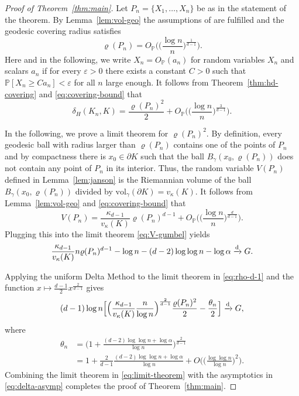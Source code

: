 \documentclass[a4paper,12pt,reqno]{amsart}
\theoremstyle{definition}
\newcommand{\IP}{\mathbb{P}}
\newcommand{\vol}{\mathrm{vol}}
\begin{document}
\begin{proof}[Proof of Theorem~\ref{thm:main}]
	Let $P_n=\{X_1,\dots,X_n\}$ be as in the statement of the theorem. By Lemma~\ref{lem:vol-geo} the assumptions of \cite[Theorem~2.1]{RS16} are fulfilled and the geodesic covering radius satisfies
\begin{equation} \label{eq:covering-bound}
	\varrho(P_n)=O_{\IP}\Big(\Big(\frac{\log n}{n}\Big)^{\frac{1}{d-1}}\Big).
\end{equation}
Here and in the following, we write $X_n=O_{\IP}(a_n)$ for random variables $X_n$ and scalars $a_n$ if for every $\varepsilon>0$ there exists a constant $C>0$ such that $\IP[X_n\ge Ca_n]<\varepsilon$ for all $n$ large enough. It follows from Theorem~\ref{thm:hd-covering} and \eqref{eq:covering-bound} that
\begin{equation} \label{eq:delta-asymp}
\delta_H(K_n,K)
=\frac{\varrho(P_n)^2}{2}+O_{\IP}\Big(\Big(\frac{\log n}{n}\Big)^{\frac{3}{d-1}}\Big).
\end{equation}

In the following, we prove a limit theorem for $\varrho(P_n)^2$. By definition, every geodesic ball with radius larger than $\varrho(P_n)$ contains one of the points of $P_n$ and by compactness there is $x_0\in \partial K$ such that the ball $B_{\gamma}(x_0,\varrho(P_n))$ does not contain any point of $P_n$ in its interior. Thus, the random variable $V(P_n)$ defined in Lemma~\ref{lem:janson} is the Riemannian volume of the ball $B_{\gamma}(x_0,\varrho(P_n))$ divided by $\vol_{\gamma}(\partial K)=v_{\kappa}(K)$.  It follows from Lemma~\ref{lem:vol-geo} and \eqref{eq:covering-bound} that
\begin{equation*} 
V(P_n)
=\frac{\kappa_{d-1}}{v_{\kappa}(K)}\varrho(P_n)^{d-1}+ O_{\IP}\Big(\Big(\frac{\log n}{n}\Big)^{\frac{d}{d-1}}\Big).
\end{equation*}
Plugging this into the limit theorem \eqref{eq:V-gumbel} yields 
\begin{equation} \label{eq:rho-d-1}
\frac{\kappa_{d-1}}{v_{\kappa}(K)} n\varrho(P_n)^{d-1}-\log n -(d-2)\log\log n-\log \alpha 
\xrightarrow[]{\rm d}
G.
\end{equation}

Applying the uniform Delta Method \cite[Theorem~3.8]{VdV00} to the limit theorem in \eqref{eq:rho-d-1} and the function $x\mapsto \frac{d-1}{2}x^{\frac{2}{d-1}}$ gives
\begin{equation} \label{eq:limit-theorem}
	(d-1)\log n\Big[ \Big(\frac{\kappa_{d-1}}{v_{\kappa}(K)}\frac{n}{\log n}\Big)^{\frac{2}{d-1}} \frac{\varrho(P_n)^2}{2}-\frac{\theta_n}{2}\Big]\xrightarrow[]{\rm d} G,
\end{equation}
where 
\begin{align*}
\theta_n
&=\Big(1+\frac{(d-2)\log \log n+\log \alpha}{\log n}\Big)^{\frac{2}{d-1}}\\
&=1+\frac{2}{d-1}\frac{(d-2)\log \log n+\log \alpha}{\log n}+O\Big(\Big(\frac{\log \log n}{\log n}\Big)^2\Big).
\end{align*}
Combining the limit theorem in \eqref{eq:limit-theorem} with the asymptotics in \eqref{eq:delta-asymp} completes the proof of Theorem~\ref{thm:main}. 
\end{proof}
\end{document}
